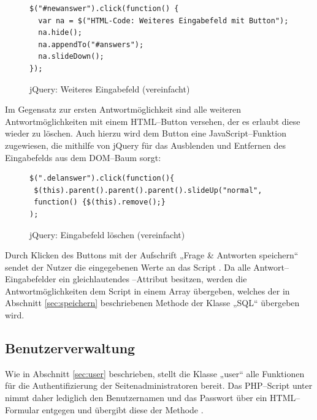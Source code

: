 \begin{figure}[H]
\begin{spacing}{1.0}
\begin{verbatim}
$("#newanswer").click(function() {
  var na = $("HTML-Code: Weiteres Eingabefeld mit Button");
  na.hide();
  na.appendTo("#answers");
  na.slideDown();	
});
\end{verbatim}
\caption{jQuery: Weiteres Eingabefeld (vereinfacht)}
\label{jquery:weitereantwort}
\end{spacing}
\end{figure}

Im Gegensatz zur ersten Antwortmöglichkeit sind alle weiteren Antwortmöglichkeiten mit einem HTML--Button versehen, der es erlaubt diese wieder zu löschen. Auch hierzu wird dem Button eine JavaScript--Funktion zugewiesen, die mithilfe von jQuery für das Ausblenden und Entfernen des Eingabefelds aus dem DOM--Baum sorgt:

\begin{figure}[H]
\begin{spacing}{1.0}
\begin{verbatim}
$(".delanswer").click(function(){
 $(this).parent().parent().parent().slideUp("normal",
 function() {$(this).remove();}
);
\end{verbatim}
\caption{jQuery: Eingabefeld löschen (vereinfacht)}
\label{jquery:antwortloeschen}
\end{spacing}
\end{figure}

Durch Klicken des Buttons mit der Aufschrift „Frage \& Antworten speichern“ sendet der Nutzer die eingegebenen Werte an das Script . Da alle Antwort--Eingabefelder ein gleichlautendes --Attribut besitzen, werden die Antwortmöglichkeiten dem Script in einem Array übergeben, welches der in Abschnitt \ref{sec:speichern} beschriebenen Methode der Klasse „SQL“ übergeben wird.

\subsection{Benutzerverwaltung}

Wie in Abschnitt \ref{sec:user} beschrieben, stellt die Klasse „user“ alle Funktionen für die Authentifizierung der Seitenadministratoren bereit. Das PHP--Script unter  nimmt daher lediglich den Benutzernamen und das Passwort über ein HTML--Formular entgegen und übergibt diese der Methode .

